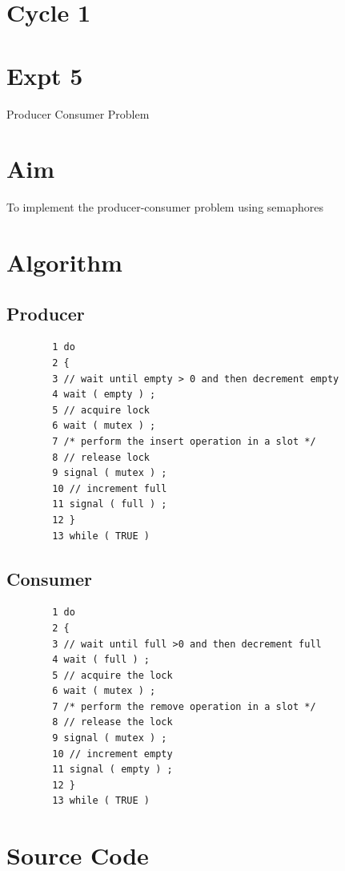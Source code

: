 \documentclass[13pt,oneside]{book}
\begin{document}
\section*{Cycle 1}
\section*{Expt 5}
\begin{center}
    \Large{Producer Consumer Problem}
\end{center}
\section*{Aim}
\large
To implement the producer-consumer problem using semaphores

\section*{Algorithm} 
    \subsection*{Producer}
    \begin{verbatim}
		1 do
		2 {
		3 // wait until empty > 0 and then decrement empty
		4 wait ( empty ) ;
		5 // acquire lock
		6 wait ( mutex ) ;
		7 /* perform the insert operation in a slot */
		8 // release lock
		9 signal ( mutex ) ;
		10 // increment full
		11 signal ( full ) ;
		12 }
		13 while ( TRUE )
	\end{verbatim}

	\subsection*{Consumer}
	\begin{verbatim}
		1 do
		2 {
		3 // wait until full >0 and then decrement full
		4 wait ( full ) ;
		5 // acquire the lock
		6 wait ( mutex ) ;
		7 /* perform the remove operation in a slot */
		8 // release the lock
		9 signal ( mutex ) ;
		10 // increment empty
		11 signal ( empty ) ;
		12 }
		13 while ( TRUE )
	\end{verbatim}

\section*{Source Code}
\small
\end{document}
